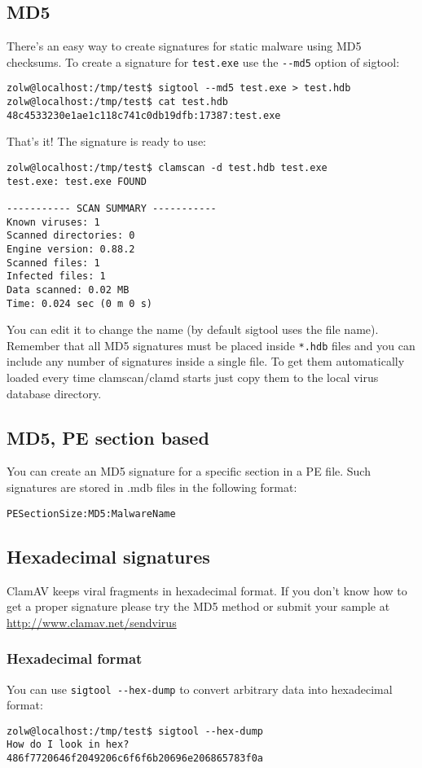 \documentclass[a4paper,titlepage,12pt]{article}
\begin{document}
    \subsection{MD5}
    There's an easy way to create signatures for static malware using MD5
    checksums. To create a signature for \verb+test.exe+ use the \verb+--md5+
    option of sigtool:
    \begin{verbatim}
zolw@localhost:/tmp/test$ sigtool --md5 test.exe > test.hdb
zolw@localhost:/tmp/test$ cat test.hdb 
48c4533230e1ae1c118c741c0db19dfb:17387:test.exe
    \end{verbatim}
    That's it! The signature is ready to use:
    \begin{verbatim}
zolw@localhost:/tmp/test$ clamscan -d test.hdb test.exe 
test.exe: test.exe FOUND

----------- SCAN SUMMARY -----------
Known viruses: 1
Scanned directories: 0
Engine version: 0.88.2
Scanned files: 1
Infected files: 1
Data scanned: 0.02 MB
Time: 0.024 sec (0 m 0 s)
    \end{verbatim}
    You can edit it to change the name (by default sigtool uses the file name).
    Remember that all MD5 signatures must be placed inside \verb+*.hdb+ files
    and you can include any number of signatures inside a single file. To get
    them automatically loaded every time clamscan/clamd starts just copy them
    to the local virus database directory.

    \subsection{MD5, PE section based}
    You can create an MD5 signature for a specific section in a PE file.
    Such signatures are stored in .mdb files in the following format:
    \begin{verbatim}
PESectionSize:MD5:MalwareName
    \end{verbatim}

    \subsection{Hexadecimal signatures}
    ClamAV keeps viral fragments in hexadecimal format. If you don't know how
    to get a proper signature please try the MD5 method or submit your sample
    at \url{http://www.clamav.net/sendvirus}

    \subsubsection{Hexadecimal format}
    You can use \verb+sigtool --hex-dump+ to convert arbitrary data into
    hexadecimal format:
    \begin{verbatim}
zolw@localhost:/tmp/test$ sigtool --hex-dump
How do I look in hex?
486f7720646f2049206c6f6f6b20696e206865783f0a
    \end{verbatim}
\end{document}
